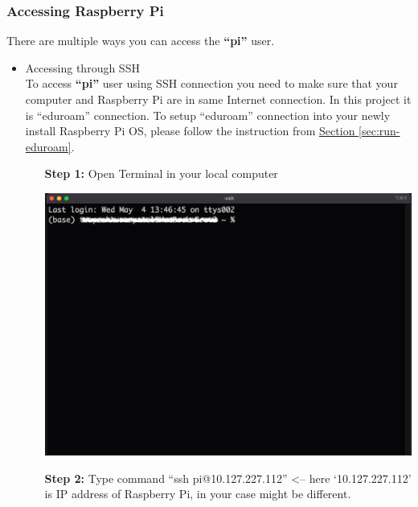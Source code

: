 	\subsubsection{Accessing Raspberry Pi}	\label{subsubsec:ssh}
		There are multiple ways you can access the \textbf{``pi''} user.  
		\begin{itemize}[leftmargin=1.2cm]
			\item Accessing through SSH \\
				To access \textbf{``pi''} user using SSH connection you need to make sure that your computer and Raspberry Pi are in same Internet connection. In this project it is ``eduroam'' connection. To setup ``eduroam'' connection into your newly install Raspberry Pi OS, please follow the instruction from \hyperref[sec:run-eduroam]{Section \ref{sec:run-eduroam}}.
				\begin{itemize}[leftmargin=1.3cm]
					\item[\textbf{Step 1:}] Open Terminal in your local computer \\
						\begin{minipage}{\textwidth}
							\vspace{2mm}
							\includegraphics[scale=0.35]{Images/raspberry_pi/ssh_login/open_iterm.png}
							\vspace{2mm}
						\end{minipage}
					\item[\textbf{Step 2:}] Type command ``ssh pi@10.127.227.112'' <-- here `10.127.227.112' is IP address of Raspberry Pi, in your case might be different.\\
						\begin{minipage}{\textwidth}

\end{minipage}
\end{itemize}
\end{itemize}
